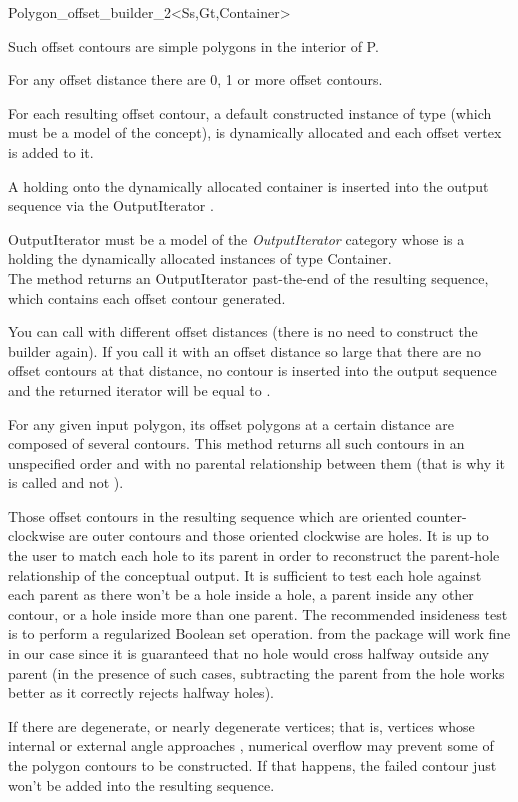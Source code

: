 \begin{ccRefClass}{Polygon_offset_builder_2<Ss,Gt,Container>}
{Such offset contours are simple polygons in the interior of P.

For any offset distance  there are 0, 1 or more offset contours.

For each resulting offset contour, a default constructed instance of  type (which must be a model of the  concept), is dynamically allocated and each offset vertex is added to it.

A  holding onto the dynamically allocated container is inserted into the output sequence via the OutputIterator .

OutputIterator must be a model of the \textit{OutputIterator} category whose  is a  holding the dynamically allocated instances of type Container.\\
The method returns an OutputIterator past-the-end of the resulting sequence, which contains each offset contour generated.

You can call  with different offset distances (there is no need to construct the builder  again). If you call it with an offset distance so large that there are no offset contours at that distance, no contour is inserted into the output sequence and the returned iterator will be equal to .

For any given input polygon, its offset polygons at a certain distance are composed of several contours. This method returns all such contours in an unspecified order and with no parental relationship between them (that is why it is called  and not ).

Those offset contours in the resulting sequence which are oriented counter-clockwise are outer contours and those oriented clockwise are holes. It is up to the user to match each hole to its parent in order to reconstruct the parent-hole relationship of the conceptual output. It is sufficient to test each hole against each parent as there won't be a hole inside a hole, a parent inside any other contour, or a hole inside more than one parent. The recommended insideness test is to perform a regularized Boolean set operation.  from the  package will work fine in our case since it is guaranteed that no hole would cross halfway outside any parent (in the presence of such cases, subtracting the parent from the hole works better as it correctly rejects halfway holes).

If there are degenerate, or nearly degenerate vertices; that is, vertices whose internal or external angle approaches , numerical overflow may prevent some of the polygon contours to be constructed. If that happens, the failed contour just won't be added into the resulting sequence.
}
  

\ccSeeAlso
{}\\
\\
\\
\end{ccRefClass}

